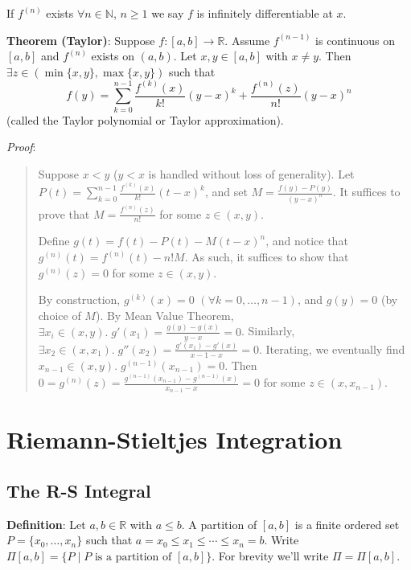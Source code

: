 \documentclass[11pt]{article}
\begin{document}
If $f^{(n)}$ exists $\forall n \in \mathbb{N}$, $n \geq 1$ we say $f$ is infinitely differentiable at $x$.

\textbf{Theorem (Taylor)}: Suppose $f : [a,b] \to \mathbb{R}$. Assume $f^{(n-1)}$ is continuous on $[a,b]$ and $f^(n)$ exists on $(a,b)$. Let $x,y \in [a,b]$ with $x \neq y$. Then $\exists z \in (\min\{x,y\}, \max\{x,y\})$ such that
\begin{displaymath}
f(y) = \sum_{k=0}^{n-1} \frac{f^{(k)}(x)}{k!} (y-x)^k + \frac{f^{(n)}(z)}{n!} (y-x)^n
\end{displaymath}
(called the Taylor polynomial or Taylor approximation).

\emph{Proof}:
\begin{quote}\vspace{-0.3cm}
Suppose $x < y$ ($y < x$ is handled without loss of generality). Let $P(t) = \sum_{k=0}^{n-1} \frac{f^{(k)}(x)}{k!} (t-x)^k$, and set $M = \frac{f(y) - P(y)}{(y-x)^n}$. It suffices to prove that $M = \frac{f^{(n)}(z)}{n!}$ for some $z \in (x,y)$.

Define $g(t) = f(t) - P(t) - M(t-x)^n$, and notice that $g^{(n)}(t) = f^{(n)}(t) - n!M$. As such, it suffices to show that $g^{(n)}(z) = 0$ for some $z \in (x,y)$.

By construction, $g^{(k)}(x) = 0$ $(\forall k = 0, \ldots, n-1)$, and $g(y) = 0$ (by choice of $M$). By Mean Value Theorem, $\exists x_i \in (x,y).\; g'(x_1) = \frac{g(y) - g(x)}{y-x} = 0$. Similarly, $\exists x_2 \in (x, x_1).\; g''(x_2) = \frac{g'(x_1) - g'(x)}{x-1 - x} = 0$. Iterating, we eventually find $x_{n-1} \in (x,y).\; g^{(n-1)}(x_{n-1}) = 0$. Then $0 = g^{(n)}(z) = \frac{g^{(n-1)}(x_{n-1}) - g^{(n-1)}(x)}{x_{n-1} - x} = 0$ for some $z \in (x, x_{n-1})$.
\end{quote}

\section{Riemann-Stieltjes Integration}

\subsection{The R-S Integral}

\textbf{Definition}: Let $a,b \in \mathbb{R}$ with $a \leq b$. A partition of $[a,b]$ is a finite ordered set $P = \{x_0, \ldots, x_n\}$ such that $a = x_0 \leq x_1 \leq \cdots \leq x_n = b$. Write $\Pi[a,b] = \{P \;|\; P \text{ is a partition of }[a,b]\}$. For brevity we'll write $\Pi = \Pi[a,b]$.
\end{document}
